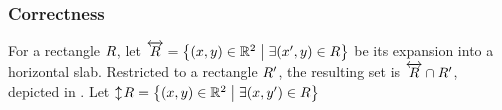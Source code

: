 \documentclass[12pt]{article}%
\begin{document}
\newcommand{\xSlabX}[1]{\overleftrightarrow{#1}}
\newcommand{\ySlabX}[1]{\updownarrow\!{#1}}
\subsubsection{Correctness}


For a rectangle $R$, let
$\xSlabX{\rect} = \Set{(x,y)\in \Re^2}{\exists (x',y) \in \rect}$ be
its expansion into a horizontal slab. Restricted to a rectangle
$R'$, the resulting set is $\xSlabX{\rect} \cap \rect'$, depicted
in .  Let
$\ySlabX{\rect} = \Set{(x,y)\in \Re^2}{\exists (x,y') \in \rect}$
\end{document}

